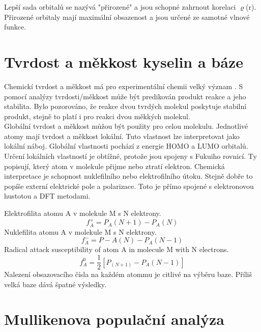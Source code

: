 \documentclass[
  digital, %
  table,   %
  lof,     %
  lot,     %
  oneside,
]{fithesis3}
\begin{document}
Lepší sada orbitalů se nazývá "přirozené" a jsou schopné zahrnout korelaci $\varrho$(r). Přirozené orbitaly mají maximální obsazenost a jsou určené ze samotné vlnové funkce.

\section{Tvrdost a měkkost kyselin a báze}
Chemickí tvrdost a měkkost má pro experimentální chemii velký význam . S pomocí analýzy tvrdosti/měkkost může být predikován produkt reakce a jeho stabilita. Bylo pozorováno, že reakce dvou tvrdých molekul poskytuje stabilní produkt, stejně to platí i pro reakci dvou měkkých molekul. \\
Globální tvrdost a měkkost můžou být použity pro celou molekulu. Jednotlivé atomy mají tvrdost a měkkost lokální. Tuto vlastnost lze interpretovat jako lokální náboj. Globální vlastnosti pochází z energie HOMO a LUMO orbitalů. Určení lokálních vlastností je obtížné, protože jsou spojeny s Fukuiho rovnicí. Ty popisují, který atom v molekule přijme nebo ztratí elektron. Chemická interpretace je schopnost nuklefilního nebo elektrofilního útoku. Stejně dobře to popíše externí elektrické pole a polarizace. Toto je přímo spojené s elektronovou hustotou a DFT metodami.

Elektrofilita atomu A v molekule M s N elektrony.
\begin{equation}
f_A^+ = P_A(N+1) - P_A(N)
\end{equation}
Nuklefilita atomu A v molekule M s N elektrony.
\begin{equation}
f_A^- = P-A(N) - P_A(N-1)
\end{equation}
Radical attack susceptibility of atom A in molecule M with N electrons.
\begin{equation}
f_A^0 = \frac{1}{2}[P_(N+1) - P_A(N-1)]
\end{equation}
Nalezení obsazovacího čísla na každém atommu je citlivé na výběru baze. Příliš velká baze dává špatné výsledky.

\section{Mullikenova populační analýza}
\end{document}
